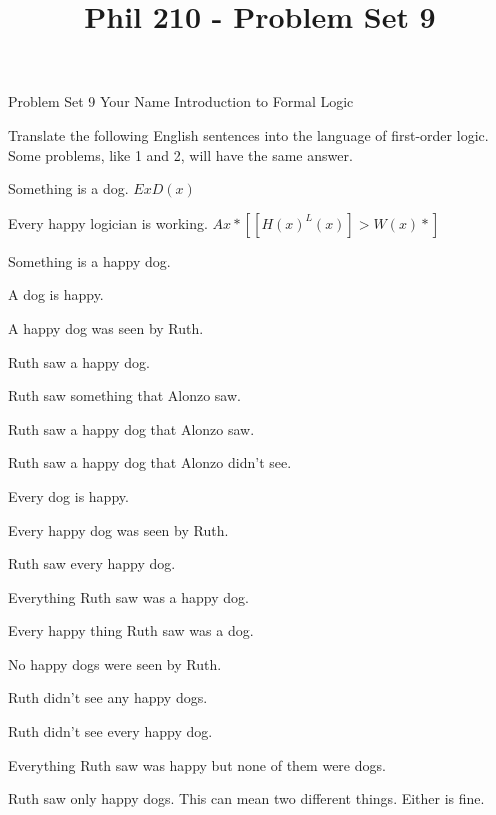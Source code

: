 
\title{Phil 210 - Problem Set 9}

\heading
Problem Set 9
Your Name
Introduction to Formal Logic
\endheading

Translate the following English sentences into the language of first-order logic. Some problems, like 1 and 2, will have the same answer.

\quantifiers
\problems
{}
Something is a dog.
	\answer 
	$ Ex D(x) $
	\endanswer\Bigskip

Every happy logician is working.
	\answer 
	$ Ax*[[H(x) ^ L(x)] > W(x)*] $
	\endanswer

Something is a happy dog.
	\answer
	$ $
	\endanswer

A dog is happy.
	\answer
	$ $
	\endanswer

A happy dog was seen by Ruth.
	\answer
	$ $
	\endanswer

Ruth saw a happy dog.
	\answer
	$ $
	\endanswer

Ruth saw something that Alonzo saw.
	\answer
	$ $
	\endanswer

Ruth saw a happy dog that Alonzo saw.
	\answer
	$ $
	\endanswer

Ruth saw a happy dog that Alonzo didn't see.
	\answer
	$ $
	\endanswer

Every dog is happy.
	\answer
	$ $
	\endanswer

Every happy dog was seen by Ruth.
	\answer
	$ $
	\endanswer

Ruth saw every happy dog.
	\answer
	$ $
	\endanswer

Everything Ruth saw was a happy dog.
	\answer
	$ $
	\endanswer

Every happy thing Ruth saw was a dog.
	\answer
	$ $
	\endanswer

No happy dogs were seen by Ruth.
	\answer
	$ $
	\endanswer

Ruth didn't see any happy dogs.
	\answer
	$ $
	\endanswer

Ruth didn't see every happy dog.
	\answer
	$ $
	\endanswer

Everything Ruth saw was happy but none of them were dogs.
	\answer
	$ $
	\endanswer

Ruth saw only happy dogs.
\Hint This can mean two different things. Either is fine.
	\answer
	$ $
	\endanswer

